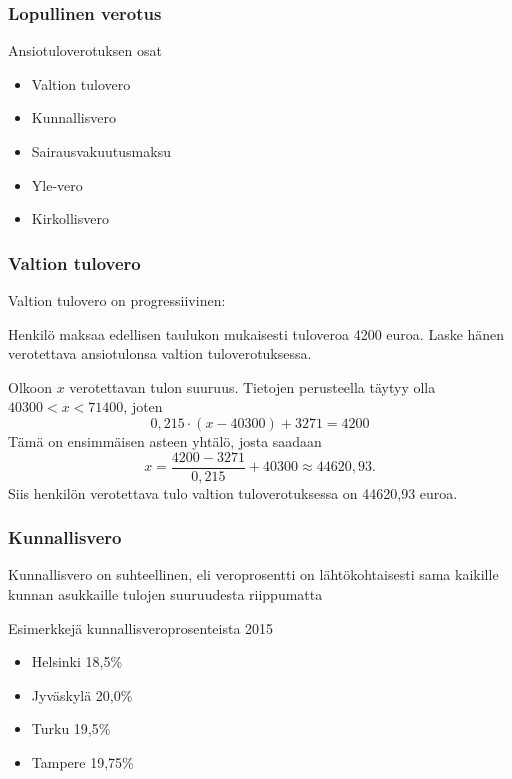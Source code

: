 \documentclass[]{beamer}\usepackage[]{graphicx}\usepackage[]{color}
\begin{document}
\begin{frame}
\frametitle{Lopullinen verotus}
\begin{block}{Ansiotuloverotuksen osat}
	\begin{itemize}
		\item Valtion tulovero
		\item Kunnallisvero
		\item Sairausvakuutusmaksu
		\item Yle-vero
		\item Kirkollisvero
	\end{itemize}
\end{block}
 \end{frame}

\begin{frame}
\frametitle{Valtion tulovero}
\pause
Valtion tulovero on progressiivinen:
\begin{table}[h]
	\begin{small}
	    
	\end{small}
  \caption*{Tuloveroasteikko 2015}
\end{table}
\end{frame}


\begin{frame}
	\begin{esim}
		Henkilö maksaa edellisen taulukon mukaisesti tuloveroa 4200 euroa. Laske hänen verotettava ansiotulonsa valtion tuloverotuksessa.
	\end{esim}
	\begin{ratkaisu}
		\pause Olkoon \(x\) verotettavan tulon suuruus. \pause Tietojen perusteella täytyy olla \(40300 < x < 71400\), \pause joten 
		\[
			0,215\cdot(x-40300) + 3271 = 4200
		\]\pause
		Tämä on ensimmäisen asteen yhtälö, josta saadaan \pause
		\[
			x = \frac{4200-3271}{0,215}+40300 \approx 44620,93.
		\] \pause
		Siis henkilön verotettava tulo valtion tuloverotuksessa on 44620,93 euroa.
	\end{ratkaisu}
\end{frame}
\begin{frame}
\frametitle{Kunnallisvero}
\pause
Kunnallisvero on suhteellinen, eli veroprosentti on lähtökohtaisesti sama kaikille kunnan asukkaille tulojen suuruudesta riippumatta
	\begin{block}{Esimerkkejä kunnallisveroprosenteista 2015}
		\begin{itemize}
			\item Helsinki 18,5\% 
			\item Jyväskylä 20,0\%
			\item Turku 19,5\%
			\item Tampere 19,75\%
		\end{itemize}
	\end{block}
\end{frame}
\end{document}
